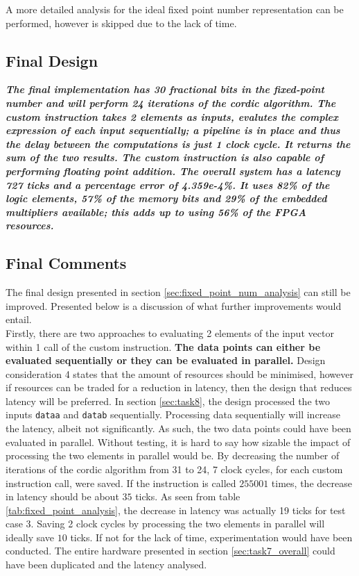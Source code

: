 \documentclass{article}
\begin{document}
A more detailed analysis for the ideal fixed point number representation can be performed, however is skipped due to the lack of time.\\ 

\subsection{Final Design}

\textbf{\textit{The final implementation has 30 fractional bits in the fixed-point number and will perform 24 iterations of the cordic algorithm. The custom instruction takes 2 elements as inputs, evalutes the complex expression of each input sequentially; a pipeline is in place and thus the delay between the computations is just 1 clock cycle. It returns the sum of the two results. The custom instruction is also capable of performing floating point addition. The overall system has a latency 727 ticks and a percentage error of 4.359e-4\%. It uses 82\% of the logic elements, 57\% of the memory bits and 29\% of the embedded multipliers available; this adds up to using 56\% of the FPGA resources.}} 

\subsection{Final Comments}

The final design presented in section \ref{sec:fixed_point_num_analysis} can still be improved. Presented below is a discussion of what further improvements would entail.\\ 

Firstly, there are two approaches to evaluating 2 elements of the input vector within 1 call of the custom instruction. \textbf{The data points can either be evaluated sequentially or they can be evaluated in parallel.} Design consideration 4 states that the amount of resources should be minimised, however if resources can be traded for a reduction in latency, then the design that reduces latency will be preferred. In section \ref{sec:task8}, the design processed the two inputs {\tt dataa} and {\tt datab} sequentially. Processing data sequentially will increase the latency, albeit not significantly. As such, the two data points could have been evaluated in parallel. Without testing, it is hard to say how sizable the impact of processing the two elements in parallel would be. By decreasing the number of iterations of the cordic algorithm from 31 to 24, 7 clock cycles, for each custom instruction call, were saved. If the instruction is called $255001$ times, the decrease in latency should be about $35$ ticks. As seen from table \ref{tab:fixed_point_analysis}, the decrease in latency was actually 19 ticks for test case 3. Saving 2 clock cycles by processing the two elements in parallel will ideally save $10$ ticks. If not for the lack of time, experimentation would have been conducted. The entire hardware presented in section \ref{sec:task7_overall} could have been duplicated and the latency analysed.\\
\end{document}
